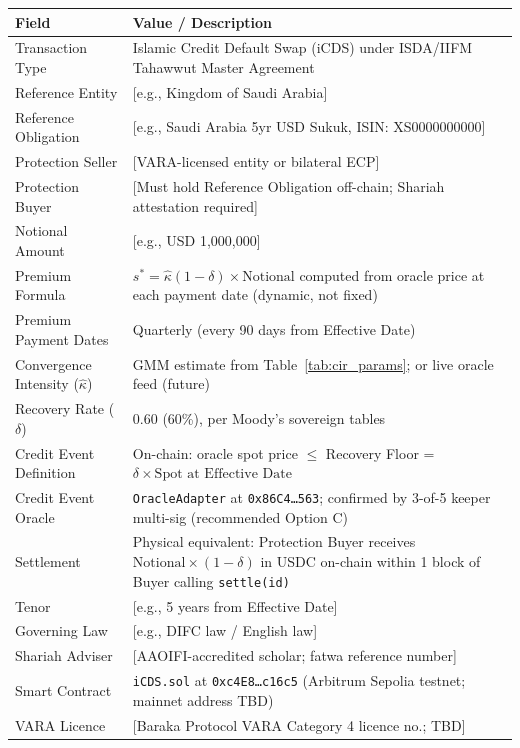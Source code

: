 \documentclass[12pt]{article}
\theoremstyle{plain}
\theoremstyle{definition}
\theoremstyle{remark}
\begin{document}
\begin{longtable}{p{}p{}}
  \toprule
  \textbf{Field} & \textbf{Value / Description} \\
  \midrule
  \endhead
  Transaction Type & Islamic Credit Default Swap (iCDS) under ISDA/IIFM
    Tahawwut Master Agreement~\cite{IIFM2010} \\[4pt]
  Reference Entity & [e.g., Kingdom of Saudi Arabia] \\[4pt]
  Reference Obligation & [e.g., Saudi Arabia 5yr USD Sukuk, ISIN: XS0000000000] \\[4pt]
  Protection Seller & [VARA-licensed entity or bilateral ECP] \\[4pt]
  Protection Buyer & [Must hold Reference Obligation off-chain; Shariah
    attestation required] \\[4pt]
  Notional Amount & [e.g., USD 1,000,000] \\[4pt]
  Premium Formula & $s^* = \hat{\kappa}(1-\delta) \times \text{Notional}$
    computed from oracle price at each payment date (dynamic, not fixed) \\[4pt]
  Premium Payment Dates & Quarterly (every 90 days from Effective Date) \\[4pt]
  Convergence Intensity ($\hat{\kappa}$) & GMM estimate from Table~\ref{tab:cir_params};
    or live oracle feed (future) \\[4pt]
  Recovery Rate ($\delta$) & 0.60 (60\%), per Moody's sovereign tables \\[4pt]
  Credit Event Definition & On-chain: oracle spot price $\leq$ Recovery Floor =
    $\delta \times \text{Spot at Effective Date}$ \\[4pt]
  Credit Event Oracle & \texttt{OracleAdapter} at \texttt{0x86C4\ldots563};
    confirmed by 3-of-5 keeper multi-sig (recommended Option C) \\[4pt]
  Settlement & Physical equivalent: Protection Buyer receives
    $\text{Notional}\times(1-\delta)$ in USDC on-chain within 1 block of
    Buyer calling \texttt{settle(id)} \\[4pt]
  Tenor & [e.g., 5 years from Effective Date] \\[4pt]
  Governing Law & [e.g., DIFC law / English law] \\[4pt]
  Shariah Adviser & [AAOIFI-accredited scholar; fatwa reference number] \\[4pt]
  Smart Contract & \texttt{iCDS.sol} at \texttt{0xc4E8\ldots c16c5}
    (Arbitrum Sepolia testnet; mainnet address TBD) \\[4pt]
  VARA Licence & [Baraka Protocol VARA Category 4 licence no.; TBD] \\
  \bottomrule
\end{longtable}
\end{document}
